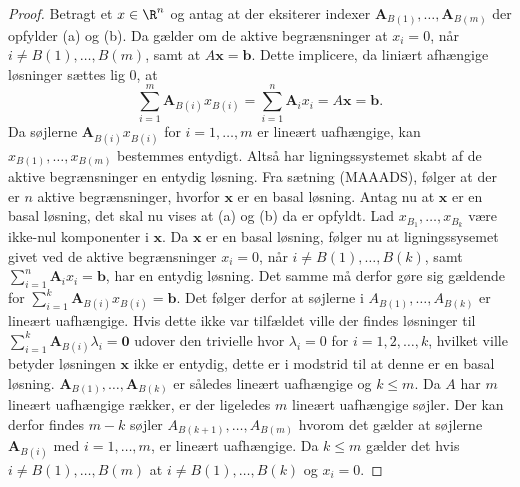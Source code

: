 \begin{proof}
Betragt et $x \in \R^n$ og antag at der eksiterer indexer $\mathbf{A}_{B(1)},\ldots,\mathbf{A}_{B(m)}$ der opfylder (a) og (b).
Da gælder om de aktive begrænsninger at $x_i=0$, når $i\neq B(1),\ldots,B(m)$, samt at $A\mathbf{x}=\mathbf{b}$.
Dette implicere, da liniært afhængige løsninger sættes lig $0$,  at 
%
$$\sum_{i=1}^{m}\textbf{A}_{B(i)}x_{B(i)}=\sum_{i=1}^{n}\textbf{A}_ix_i=A\textbf{x}=\textbf{b}.$$
%
Da søjlerne $\textbf{A}_{B(i)}x_{B(i)}$ for $i=1,\ldots,m$ er lineært uafhængige, kan $x_{B(1)},\ldots,x_{B(m)}$ bestemmes entydigt. 
Altså har ligningssystemet skabt af de aktive begrænsninger en entydig løsning.
Fra sætning (MAAADS), følger at der er $n$ aktive begrænsninger, hvorfor $\mathbf{x}$ er en basal løsning. 
Antag nu at $\mathbf{x}$ er en basal løsning, det skal nu vises at (a) og (b) da er opfyldt.
Lad $x_{B_1},\ldots,x_{B_k}$ være ikke-nul komponenter i $\textbf{x}$.
Da $\mathbf{x}$ er en basal løsning, følger nu at ligningssysemet givet ved de aktive begrænsninger $x_i=0$, når $i\neq B(1),\ldots,B(k)$, samt  $\sum_{i=1}^{n}\mathbf{A}_ix_i=\mathbf{b}$, har en entydig løsning. 
Det samme må derfor gøre sig gældende for $\sum_{i=1}^{k}\mathbf{A}_{B(i)}x_{B(i)}=\mathbf{b}$.
Det følger derfor at søjlerne i $A_{B(1)},\ldots,A_{B(k)}$ er lineært uafhængige.
Hvis dette ikke var tilfældet ville der findes løsninger til $\sum_{i=1}^{k}\mathbf{A}_{B(i)} \lambda_i=\mathbf{0}$ udover den trivielle hvor $\lambda_i=0$ for $i=1,2,\ldots,k$, hvilket ville betyder løsningen $\mathbf{x}$ ikke er entydig, dette er i modstrid til at denne er en basal løsning.
$\mathbf{A}_{B(1)},\ldots ,\mathbf{A}_{B(k)}$ er således lineært uafhængige og $k \leq m$.
Da $A$ har $m$ lineært uafhængige rækker, er der ligeledes $m$ lineært uafhængige søjler.
Der kan derfor findes $m-k$ søjler $A_{B(k+1)},\ldots,A_{B(m)}$ hvorom det gælder at søjlerne $\mathbf{A}_{B(i)}$ med $i=1,\ldots,m$, er lineært uafhængige.
Da $k \leq m$ gælder det hvis $i \neq B(1),\ldots,B(m)$ at $i \neq B(1),\ldots,B(k)$ og $x_i=0$.
\end{proof}
